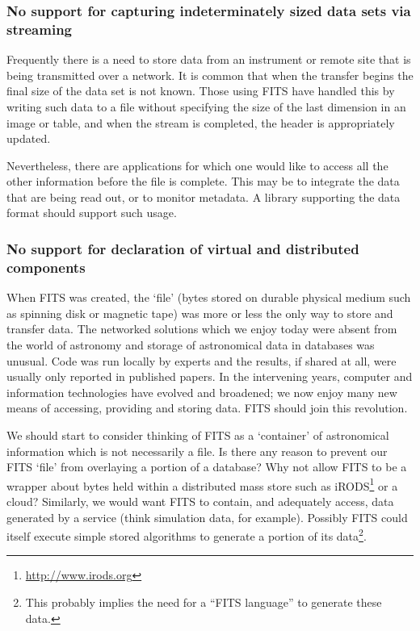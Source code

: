\documentclass[final,authoryear,5p,times,twocolumn]{elsarticle}
\begin{document}
{{\subsubsection{No support for capturing indeterminately sized data sets via streaming}


Frequently there is a need to store data from an instrument or remote
site that is being transmitted over a network. It is common that when
the transfer begins the final size of the data set is not known. Those
using FITS have handled this by writing such data to a file without
specifying the size of the last dimension in an image or table, and
when the stream is completed, the header is appropriately updated.


Nevertheless, there are applications for which one would like to
access all the other information before the file is complete. This may
be to integrate the data that are being read out, or to monitor
metadata. A library supporting the data format should support such
usage.


\subsubsection{No support for declaration of virtual and distributed components}
\label{subsection_virt_dist_components}


When FITS was created, the `file' (bytes stored on durable physical
medium such as spinning disk or magnetic tape) was more or less the
only way to store and transfer data. The networked solutions which we
enjoy today were absent from the world of astronomy and storage of
astronomical data in databases was unusual. Code was run locally by
experts and the results, if shared at all, were usually only reported
in published papers. In the intervening years, computer and
information technologies have evolved and broadened; we now enjoy many
new means of accessing, providing and storing data. FITS should join
this revolution.


We should start to consider thinking of FITS as a `container' of
astronomical information which is not necessarily a file. Is there
any reason to prevent our FITS `file' from overlaying a portion of a
database? Why not allow FITS to be a wrapper about bytes held within a
distributed mass store such as
iRODS\footnote{\url{http://www.irods.org}} \citep[see e.g.,][]{2007AGUFMIN13B1214R}
or a cloud?  Similarly, we would
want FITS to contain, and adequately access, data generated by a
service (think simulation data, for example). Possibly FITS could
itself execute simple stored algorithms to generate a portion of its
data\footnote{This probably implies the need for a ``FITS language'' 
to generate these data.}.


}}
\end{document}
